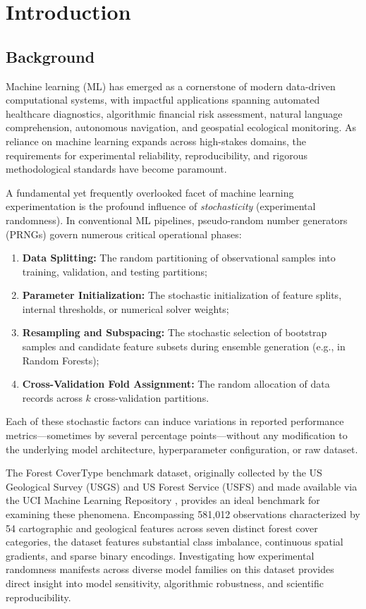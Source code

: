 \chapter{Introduction}
\label{ch:introduction}

\section{Background}
\label{sec:background}

Machine learning (ML) has emerged as a cornerstone of modern data-driven computational systems, with impactful applications spanning automated healthcare diagnostics, algorithmic financial risk assessment, natural language comprehension, autonomous navigation, and geospatial ecological monitoring. As reliance on machine learning expands across high-stakes domains, the requirements for experimental reliability, reproducibility, and rigorous methodological standards have become paramount.

A fundamental yet frequently overlooked facet of machine learning experimentation is the profound influence of \textit{stochasticity} (experimental randomness). In conventional ML pipelines, pseudo-random number generators (PRNGs) govern numerous critical operational phases:
\begin{enumerate}[label=(\roman*)]
    \item \textbf{Data Splitting:} The random partitioning of observational samples into training, validation, and testing partitions;
    \item \textbf{Parameter Initialization:} The stochastic initialization of feature splits, internal thresholds, or numerical solver weights;
    \item \textbf{Resampling and Subspacing:} The stochastic selection of bootstrap samples and candidate feature subsets during ensemble generation (e.g., in Random Forests);
    \item \textbf{Cross-Validation Fold Assignment:} The random allocation of data records across $k$ cross-validation partitions.
\end{enumerate}

Each of these stochastic factors can induce variations in reported performance metrics---sometimes by several percentage points---without any modification to the underlying model architecture, hyperparameter configuration, or raw dataset. 

The Forest CoverType benchmark dataset, originally collected by the US Geological Survey (USGS) and US Forest Service (USFS) and made available via the UCI Machine Learning Repository \cite{blackard1999comparative}, provides an ideal benchmark for examining these phenomena. Encompassing 581,012 observations characterized by 54 cartographic and geological features across seven distinct forest cover categories, the dataset features substantial class imbalance, continuous spatial gradients, and sparse binary encodings. Investigating how experimental randomness manifests across diverse model families on this dataset provides direct insight into model sensitivity, algorithmic robustness, and scientific reproducibility.

